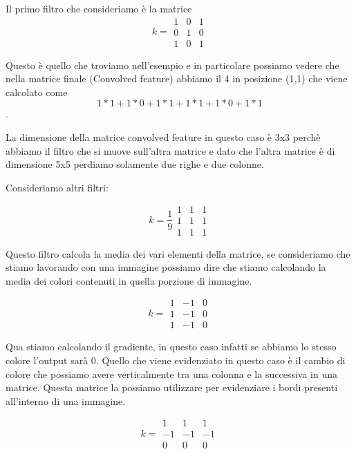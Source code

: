 \documentclass[14pt]{extreport}
\begin{document}
Il primo filtro che consideriamo è la matrice
\begin{equation}
	k = \begin{matrix}
		1 & 0 & 1 \\
		0 & 1 & 0 \\
		1 & 0 & 1
	\end{matrix}
\end{equation}

Questo è quello che troviamo nell'esempio e in particolare possiamo vedere che nella matrice finale (Convolved feature) abbiamo il 4 in posizione
(1,1) che viene calcolato come
$$1*1+1*0+1*1+1*1+1*0+1*1$$.

La dimensione della matrice convolved feature in questo caso è 3x3 perchè abbiamo il filtro che si muove sull'altra matrice e dato che l'altra matrice
è di dimensione 5x5 perdiamo solamente due righe e due colonne.

Consideriamo altri filtri:

\begin{equation}
	k = \frac{1}{9}\begin{matrix}
		1 & 1 & 1 \\
		1 & 1 & 1 \\
		1 & 1 & 1
	\end{matrix}
\end{equation}

Questo filtro calcola la media dei vari elementi della matrice, se consideriamo che stiamo lavorando con una immagine possiamo dire che stiamo
calcolando la media dei colori contenuti in quella porzione di immagine.


\begin{equation}
	k = \begin{matrix}
		1 & -1 & 0 \\
		1 & -1 & 0 \\
		1 & -1 & 0
	\end{matrix}
\end{equation}

Qua stiamo calcolando il gradiente, in questo caso infatti se abbiamo lo stesso colore l'output sarà 0. Quello che viene evidenziato in questo caso è
il cambio di colore che possiamo avere verticalmente tra una colonna e la successiva in una matrice. Questa matrice la possiamo utilizzare per
evidenziare i bordi presenti all'interno di una immagine.

\begin{equation}
	k = \begin{matrix}
		1  & 1  & 1  \\
		-1 & -1 & -1 \\
		0  & 0  & 0
	\end{matrix}
\end{equation}
\end{document}
